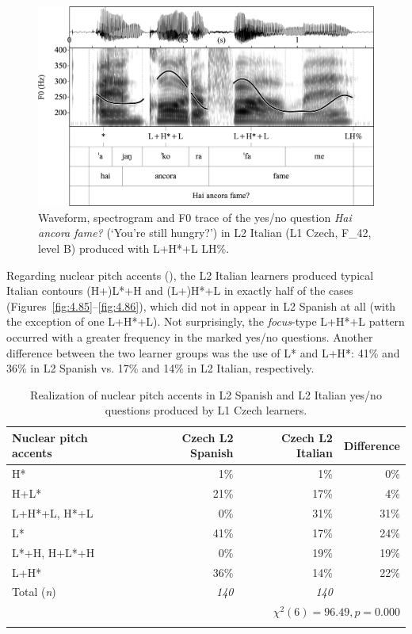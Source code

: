 \begin{figure}


\includegraphics[width=\textwidth]{figures/Figure_4.84.png}


\caption{Waveform, spectrogram and F0 trace of the yes/no question \textit{Hai ancora fame?} (‘You’re still hungry?’) in L2 Italian (L1 Czech, F\_42, level B) produced with L+H*+L LH\%.}
\label{fig:4.84}
\end{figure}

Regarding nuclear pitch accents (), the L2 Italian learners produced typical Italian contours (H+)L*+H and (L+)H*+L in exactly half of the cases  (Figures~\ref{fig:4.85}--\ref{fig:4.86}), which did not in appear in L2 Spanish at all (with the exception of one L+H*+L). Not surprisingly, the \textit{focus}{}-type L+H*+L pattern occurred with a greater frequency in the marked yes/no questions. Another difference between the two learner groups was the use of L* and L+H*: 41\% and 36\% in L2 Spanish vs. 17\% and 14\% in L2 Italian, respectively.

\begin{table}
\begin{tabularx}{\textwidth}{Qrrr}

\lsptoprule

{Nuclear pitch accents} & {Czech L2 Spanish} & {Czech L2 Italian} & {Difference}\\
\midrule
H* &  1\% &  1\% &  0\%\\
H+L* &  21\% &  17\% &  4\%\\
L+H*+L, H*+L &  0\% & 31\% &  31\%\\
L* &  41\% &  17\% &  24\%\\
L*+H, H+L*+H &  0\% & 19\% &  19\%\\
L+H* &  36\% &  14\% &  22\%\\
\midrule
Total (\textit{n}) & {\itshape 140} & {\itshape 140} &  \\
\\
\lspbottomrule
\end{tabularx}

\caption{Realization of nuclear pitch accents in L2 Spanish and L2 Italian yes/no questions produced by L1 Czech learners.}
\label{tab:4.23}
\end{table}

